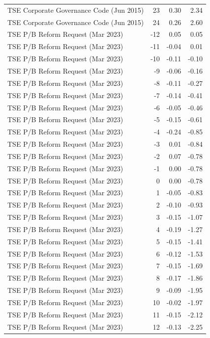 \begin{table}
\begin{tabular}{lrrr}
TSE Corporate Governance Code (Jun 2015) & 23 & 0.30 & 2.34 \\
TSE Corporate Governance Code (Jun 2015) & 24 & 0.26 & 2.60 \\
TSE P/B Reform Request (Mar 2023) & -12 & 0.05 & 0.05 \\
TSE P/B Reform Request (Mar 2023) & -11 & -0.04 & 0.01 \\
TSE P/B Reform Request (Mar 2023) & -10 & -0.11 & -0.10 \\
TSE P/B Reform Request (Mar 2023) & -9 & -0.06 & -0.16 \\
TSE P/B Reform Request (Mar 2023) & -8 & -0.11 & -0.27 \\
TSE P/B Reform Request (Mar 2023) & -7 & -0.14 & -0.41 \\
TSE P/B Reform Request (Mar 2023) & -6 & -0.05 & -0.46 \\
TSE P/B Reform Request (Mar 2023) & -5 & -0.15 & -0.61 \\
TSE P/B Reform Request (Mar 2023) & -4 & -0.24 & -0.85 \\
TSE P/B Reform Request (Mar 2023) & -3 & 0.01 & -0.84 \\
TSE P/B Reform Request (Mar 2023) & -2 & 0.07 & -0.78 \\
TSE P/B Reform Request (Mar 2023) & -1 & 0.00 & -0.78 \\
TSE P/B Reform Request (Mar 2023) & 0 & 0.00 & -0.78 \\
TSE P/B Reform Request (Mar 2023) & 1 & -0.05 & -0.83 \\
TSE P/B Reform Request (Mar 2023) & 2 & -0.10 & -0.93 \\
TSE P/B Reform Request (Mar 2023) & 3 & -0.15 & -1.07 \\
TSE P/B Reform Request (Mar 2023) & 4 & -0.19 & -1.27 \\
TSE P/B Reform Request (Mar 2023) & 5 & -0.15 & -1.41 \\
TSE P/B Reform Request (Mar 2023) & 6 & -0.12 & -1.53 \\
TSE P/B Reform Request (Mar 2023) & 7 & -0.15 & -1.69 \\
TSE P/B Reform Request (Mar 2023) & 8 & -0.17 & -1.86 \\
TSE P/B Reform Request (Mar 2023) & 9 & -0.09 & -1.95 \\
TSE P/B Reform Request (Mar 2023) & 10 & -0.02 & -1.97 \\
TSE P/B Reform Request (Mar 2023) & 11 & -0.15 & -2.12 \\
TSE P/B Reform Request (Mar 2023) & 12 & -0.13 & -2.25 \\

\end{tabular}
\end{table}

